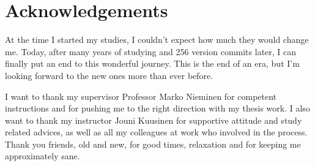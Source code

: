 \documentclass[12pt,a4paper,oneside,pdftex]{report}
\begin{document}





\chapter*{Acknowledgements}

At the time I started my studies, I couldn't expect how much they would change me.
Today, after many years of studying and 256 version commits later, I can finally put an end to this wonderful journey.
This is the end of an era, but I'm looking forward to the new ones more than ever before.

I want to thank my supervisor Professor Marko Nieminen for competent instructions and for pushing me to the right direction with my thesis work. 
I also want to thank my instructor Jouni Kuusinen for supportive attitude and study related advices, as well as all my colleagues at work who involved in the process.
Thank you friends, old and new, for good times, relaxation and for keeping me approximately sane.
\end{document}
